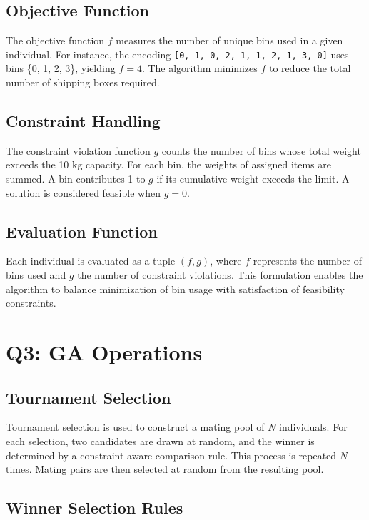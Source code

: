 \documentclass[journal,12pt,onecolumn]{IEEEtran}
\begin{document}
\subsection{Objective Function}

The objective function $f$ measures the number of unique bins used in a given individual. For instance, the encoding \texttt{[0, 1, 0, 2, 1, 1, 2, 1, 3, 0]} uses bins \{0, 1, 2, 3\}, yielding $f = 4$. The algorithm minimizes $f$ to reduce the total number of shipping boxes required.

\subsection{Constraint Handling}

The constraint violation function $g$ counts the number of bins whose total weight exceeds the 10 kg capacity. For each bin, the weights of assigned items are summed. A bin contributes 1 to $g$ if its cumulative weight exceeds the limit. A solution is considered feasible when $g = 0$.

\subsection{Evaluation Function}

Each individual is evaluated as a tuple $(f, g)$, where $f$ represents the number of bins used and $g$ the number of constraint violations. This formulation enables the algorithm to balance minimization of bin usage with satisfaction of feasibility constraints.


\section{Q3: GA Operations}

\subsection{Tournament Selection}

Tournament selection is used to construct a mating pool of $N$ individuals. For each selection, two candidates are drawn at random, and the winner is determined by a constraint-aware comparison rule. This process is repeated $N$ times. Mating pairs are then selected at random from the resulting pool.

\subsection{Winner Selection Rules}
\end{document}
